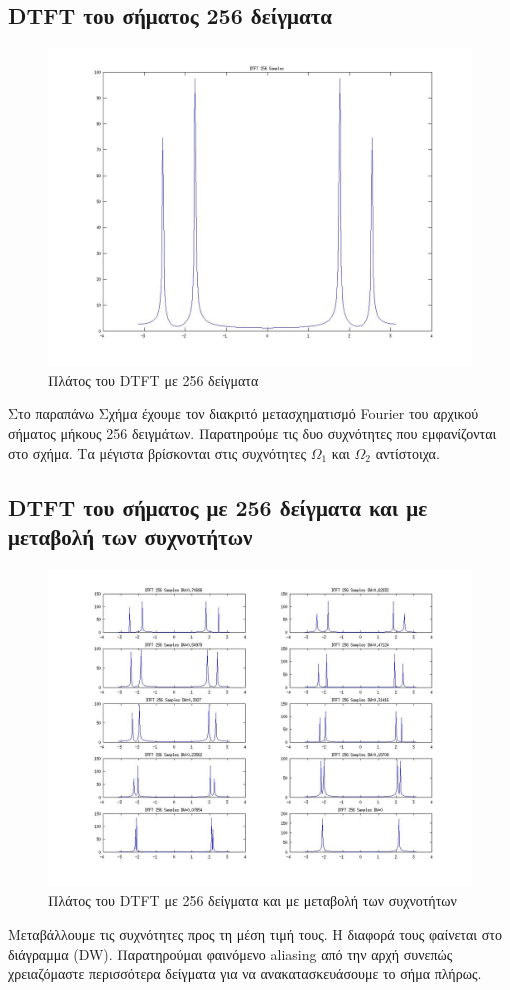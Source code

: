 \documentclass[a4paper,10pt]{article} \usepackage{anysize}
\begin{document}
\subsection{DTFT του σήματος 256 δείγματα}
\begin{figure}[H]
\caption{Πλάτος του DTFT με 256 δείγματα}
\centering
	\includegraphics[scale=0.4]{files/02-DTFT_256_Samples.jpg}
\end{figure}
Στο παραπάνω Σχήμα έχουμε τον διακριτό μετασχηματισμό Fourier του αρχικού
σήματος μήκους 256 δειγμάτων. Παρατηρούμε τις δυο συχνότητες που εμφανίζονται
στο σχήμα. Τα μέγιστα βρίσκονται στις συχνότητες $\Omega_1$ και $\Omega_2$
αντίστοιχα.

\subsection{DTFT του σήματος με 256 δείγματα και με μεταβολή των συχνοτήτων}
\begin{figure}[H]
\caption{Πλάτος του DTFT με 256 δείγματα και με μεταβολή των συχνοτήτων}
\centering
	\includegraphics[scale=0.4]{files/03-DTFT_256_Samples.jpg}
\end{figure}
Μεταβάλλουμε τις συχνότητες προς τη μέση τιμή τους. Η διαφορά τους φαίνεται
στο διάγραμμα (DW). Παρατηρούμαι φαινόμενο aliasing από την αρχή συνεπώς
χρειαζόμαστε περισσότερα δείγματα για να ανακατασκευάσουμε το σήμα πλήρως.
\end{document}
